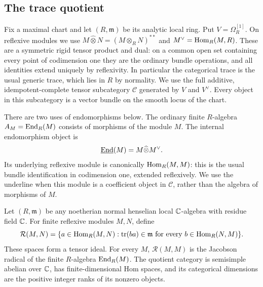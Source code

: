 \subsection{The trace quotient}

Fix a maximal chart and let $(R,\mathfrak m)$ be its analytic local
ring.  Put $V=\Omega_R^{[1]}$.  On reflexive modules we use
$M\mathbin{\widehat\otimes}N=(M\otimes_RN)^{**}$ and
$M^\vee=\operatorname{Hom}_R(M,R)$.  These are a symmetric rigid tensor product
and dual: on a common open set containing every point of codimension
one they are the ordinary bundle operations, and all identities
extend uniquely by reflexivity.  In particular the categorical trace
is the usual generic trace, which lies in $R$ by normality.  We use
the full additive, idempotent-complete tensor subcategory $\mathcal C$
generated by $V$ and $V^\vee$.  Every object in this subcategory is a vector
bundle on the smooth locus of the chart.

There are two uses of endomorphisms below.  The ordinary finite
$R$-algebra $A_M=\operatorname{End}_R(M)$ consists of morphisms of the module $M$.
The internal endomorphism object is
\[
 \underline{\operatorname{End}}(M)=M\widehat\otimes M^\vee.
\]
Its underlying reflexive module is canonically $\operatorname{Hom}_R(M,M)$: this is
the usual bundle identification in codimension one, extended
reflexively.  We use the underline when this module is a coefficient
object in $\mathcal C$, rather than the algebra of morphisms of $M$.

\begin{lemma}
\label{loc:trace-radical}
Let $(R,\mathfrak m)$ be any noetherian normal henselian local
$\mathbb C$-algebra with residue field $\mathbb C$.  For finite reflexive modules
$M,N$, define
\[
 \mathcal R(M,N)=
 \{a\in\operatorname{Hom}_R(M,N):\operatorname{tr}(ba)\in\mathfrak m
                 \text{ for every }b\in\operatorname{Hom}_R(N,M)\}.
\]
These spaces form a tensor ideal.  For every $M$,
$\mathcal R(M,M)$ is the Jacobson radical of the finite
$R$-algebra $\operatorname{End}_R(M)$.  The quotient category is semisimple
abelian over $\mathbb C$, has finite-dimensional Hom spaces, and its
categorical dimensions are the positive integer ranks of its
nonzero objects.
\end{lemma}

